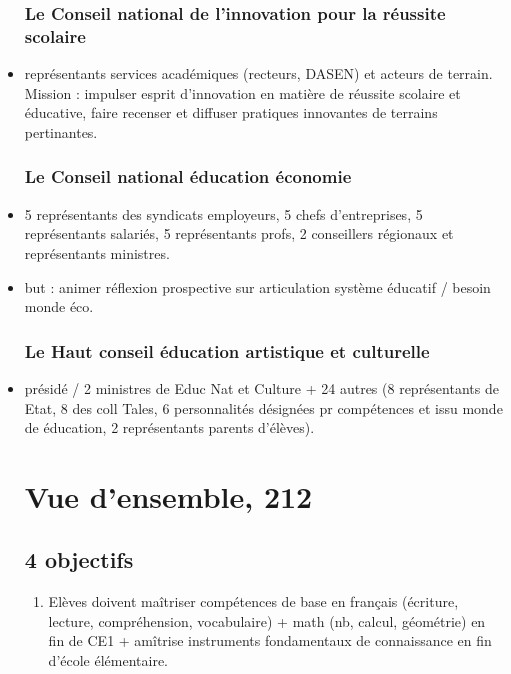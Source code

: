 \documentclass[12pt]{report}
\begin{document}
\begin{itemize}
\subsection{Le Conseil national de l'innovation pour la réussite scolaire}

\item représentants services académiques (recteurs, DASEN) et acteurs de terrain. Mission : impulser esprit d'innovation en matière de réussite scolaire et éducative, faire recenser et diffuser pratiques innovantes de terrains pertinantes.

\subsection{Le Conseil national éducation économie}

\item 5 représentants des syndicats employeurs, 5 chefs d'entreprises, 5 représentants salariés, 5 représentants profs, 2 conseillers régionaux et représentants ministres.\\

\item but : animer réflexion prospective sur articulation système éducatif / besoin monde éco.\\

\subsection{Le Haut conseil éducation artistique et culturelle}
\item présidé / 2 ministres de Educ Nat et Culture + 24 autres (8 représentants de Etat, 8 des coll Tales, 6 personnalités désignées pr compétences et issu monde de éducation, 2 représentants parents d'élèves).


\chapter{Vue d'ensemble, 212}

\section{4 objectifs}

\begin{enumerate}
\item Elèves doivent maîtriser compétences de base en français (écriture, lecture, compréhension, vocabulaire) + math (nb, calcul, géométrie) en fin de CE1 + amîtrise instruments fondamentaux de connaissance en fin d'école élémentaire. \\


\end{enumerate}
\end{itemize}
\end{document}
